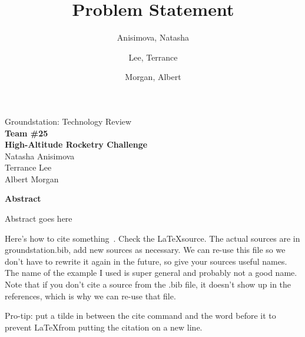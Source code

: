 \documentclass[10pt,draftclsnofoot,onecolumn]{IEEEtran}
\begin{document}
	\singlespace
	
	\title{\vspace{2in}Problem Statement}
	
	\author {
		Anisimova, Natasha
		\and
		Lee, Terrance
		\and
		Morgan, Albert
	}
	
	
	\pagestyle{empty}
	\vspace*{2in}
	\begin{center}
		\huge
		Groundstation: Technology Review\\
		\normalsize
		\vspace{5mm}
		\textbf{
			Team \#25\\
			High-Altitude Rocketry Challenge\\
		}
		\vspace{1mm}
		Natasha Anisimova\\
		Terrance Lee\\
		Albert Morgan
	\end{center}
	
	\vspace{5mm}
	
	\begin{center}
		\textbf{Abstract}
	\end{center}
	
	
	Abstract goes here
	
	
	\newpage
	
	Here's how to cite something~\cite{geom}.
	Check the \LaTeX source.
	The actual sources are in groundstation.bib, add new sources as necessary.
	We can re-use this file so we don't have to rewrite it again in the future, so give your sources useful names.
	The name of the example I used is super general and probably not a good name.
	Note that if you don't cite a source from the .bib file, it doesn't show up in the references, which is why we can re-use that file.
	
	Pro-tip: put a tilde in between the cite command and the word before it to prevent \LaTeX from putting the citation on a new line.

	\newpage

	\tableofcontents
	\newpage
	
	\pagestyle{headings}
\end{document}
